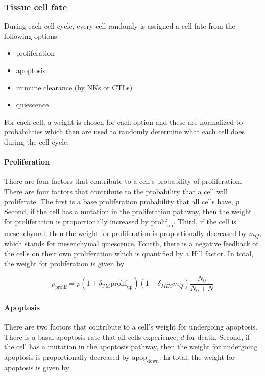 \documentclass{article}
\begin{document}
\subsubsection{Tissue cell fate}
During each cell cycle, every cell randomly is assigned a cell fate from the following options:
\begin{itemize}
\item proliferation
\item apoptosis
\item immune clearance (by NKs or CTLs)
\item quiescence
\end{itemize}

For each cell, a weight is chosen for each option and these are normalized to probabilities which then are used to randomly determine what each cell does during the cell cycle.

\paragraph{Proliferation}
There are four factors that contribute to a cell's probability of proliferation.
There are four factors that contribute to the probability that a cell will proliferate.
% 
The first is a base proliferation probability that all cells have, $p$.
Second, if the cell has a mutation in the proliferation pathway, then the weight for proliferation is proportionally increased by $\text{prolif}_{\text{up}}$.
Third, if the cell is mesenchymal, then the weight for proliferation is proportionally decreased by $m_Q$, which stands for mesenchymal quiescence.
Fourth, there is a negative feedback of the cells on their own proliferation which is quantified by a Hill factor.
In total, the weight for proliferation is given by

$$ p_{\text{prolif}} = p(1+\delta_{\text{PM}}\text{prolif}_{\text{up}})(1-\delta_{MES}m_Q)\frac{N_0}{N_0+N} $$

\paragraph{Apoptosis}
There are two factors that contribute to a cell's weight for undergoing apoptosis.
There is a basal apoptosis rate that all cells experience, $d$ for death.
Second, if the cell has a mutation in the apoptosis pathway, then the weight for undergoing apoptosis is proportionally decreased by $\text{apop}_{\text{down}}$.
In total, the weight for apoptosis is given by 
\end{document}
